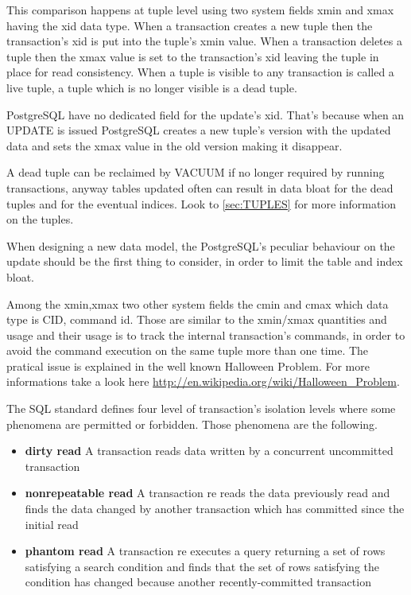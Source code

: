 This comparison happens at tuple level using two system fields xmin and xmax 
having the xid data type. 
When a transaction creates a new tuple then the transaction's xid is put into 
the tuple's xmin value. 
When a transaction deletes a tuple then the xmax value is set to the 
transaction's xid leaving the tuple in place for read consistency. 
When a tuple is visible to any transaction is called a live tuple, a tuple 
which is no longer visible is a dead tuple.\newline

PostgreSQL have no dedicated field for the update's xid. That's because when an 
UPDATE is issued PostgreSQL creates a new tuple's version with the updated 
data and sets the xmax value in the old version making it disappear.\newline

A dead tuple can be reclaimed by VACUUM if no longer required by running 
transactions, anyway tables updated often can result in data bloat for the dead 
tuples and for the eventual indices.
Look to \ref{sec:TUPLES} for more information on the 
tuples.\newline

When designing a new data model, the PostgreSQL's peculiar behaviour on the 
update should be the first thing to consider, in order to limit the table 
and index bloat. \newline

Among the xmin,xmax two other system fields the cmin and cmax which data type 
is CID, command id. Those are similar to the xmin/xmax quantities and usage 
and their usage is to track the internal transaction's commands, in order to 
avoid the command execution on the same tuple more than one time. The pratical 
issue is explained in the well known Halloween Problem. For more informations 
take a look here 
\href{http://en.wikipedia.org/wiki/Halloween_Problem}{
http://en.wikipedia.org/wiki/Halloween\_Problem}.\newline

The SQL standard defines four level of transaction's isolation levels where 
some phenomena are permitted or forbidden.
Those phenomena are the following.

\begin{itemize}
 \item \textbf{dirty read} A transaction reads data written by a concurrent 
uncommitted transaction

\item \textbf{nonrepeatable read} A transaction re reads the data previously 
read and finds the data changed by another transaction which has
committed since the initial read

\item \textbf{phantom read} A transaction re executes a query returning a set 
of rows satisfying a search condition and finds that the set of rows 
satisfying the condition has changed because another recently-committed 
transaction

\end{itemize}

